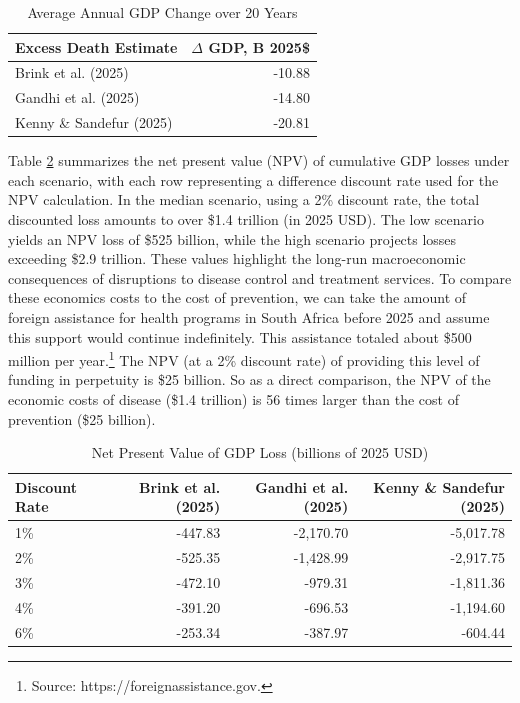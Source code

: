 \documentclass[letterpaper,12pt]{article}
\theoremstyle{definition}
\begin{document}
\begin{spacing}{1.5}
\begin{table}[H]
\centering
\caption{Average Annual GDP Change over 20 Years}
\begin{tabular}{lr}
  \toprule
  Excess Death Estimate & $\Delta$ GDP, B 2025\$ \\
  \midrule
  Brink et al. (2025) & -10.88 \\
  Gandhi et al. (2025) & -14.80 \\
  Kenny \& Sandefur (2025) & -20.81 \\
  \bottomrule
\end{tabular}
\label{tab:avgGDPChange}
\end{table}

Table \ref{tab:NPVLosses} summarizes the net present value (NPV) of cumulative GDP losses under each scenario, with each row representing a difference discount rate used for the NPV calculation. In the median scenario, using a 2\% discount rate, the total discounted loss amounts to over \$1.4 trillion (in 2025 USD). The low scenario yields an NPV loss of \$525 billion, while the high scenario projects losses exceeding \$2.9 trillion. These values highlight the long-run macroeconomic consequences of disruptions to disease control and treatment services.  To compare these economics costs to the cost of prevention, we can take the amount of foreign assistance for health programs in South Africa before 2025 and assume this support would continue indefinitely. This assistance totaled about \$500 million per year.\footnote{Source: https://foreignassistance.gov.} The NPV (at a 2\% discount rate) of providing this level of funding in perpetuity is \$25 billion.  So as a direct comparison, the NPV of the economic costs of disease (\$1.4 trillion) is 56 times larger than the cost of prevention (\$25 billion).

\begin{table}[H]
\centering
\caption{Net Present Value of GDP Loss (billions of 2025 USD)}
\begin{tabular}{lrrr}
  \toprule
 Discount Rate & Brink et al. (2025) & Gandhi et al. (2025) & Kenny \& Sandefur (2025) \\
  \midrule
  1\% & -447.83 & -2,170.70 & -5,017.78 \\
  2\% & -525.35 & -1,428.99 & -2,917.75 \\
  3\% & -472.10 & -979.31 & -1,811.36 \\
  4\% & -391.20 & -696.53 & -1,194.60 \\
  6\% & -253.34 & -387.97 & -604.44 \\
  \bottomrule
\end{tabular}
\label{tab:NPVLosses}
\end{table}


\end{spacing}
\end{document}

